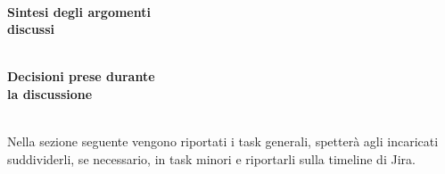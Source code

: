 \documentclass[10pt, a4paper]{article}
\title{\data}
\author{SWEetCode}
\begin{document}


\setlength{\parindent}{0mm}
\setlength{\columnsep}{2.2em}
\setlength{\columnseprule}{4pt}
\begin{paracol}{2}


\intestazione
\vspace{14.2em}

\partecipanti

\newpage

\switchcolumn
\revisioneAzioni
\vspace{8em}

\ordineGiorno

\newpage


\switchcolumn

\\
\textbf{Sintesi degli argomenti\\discussi}


 \newpage

\\
\textbf{Decisioni prese durante\\la discussione}

\switchcolumn

\discussione

\newpage

\decisioni

\end{paracol}

\vspace{5em}

\\
Nella sezione seguente vengono riportati i task generali, spetterà agli incaricati suddividerli, se necessario, in task minori e riportarli sulla timeline di Jira.
\end{document}
